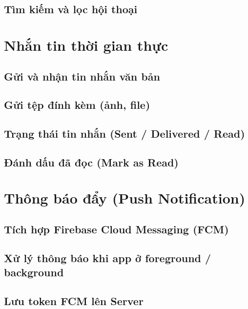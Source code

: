 \subsection{Tìm kiếm và lọc hội thoại}


\section{Nhắn tin thời gian thực}

\subsection{Gửi và nhận tin nhắn văn bản}


\subsection{Gửi tệp đính kèm (ảnh, file)}


\subsection{Trạng thái tin nhắn (Sent / Delivered / Read)}


\subsection{Đánh dấu đã đọc (Mark as Read)}


\section{Thông báo đẩy (Push Notification)}

\subsection{Tích hợp Firebase Cloud Messaging (FCM)}


\subsection{Xử lý thông báo khi app ở foreground / background}


\subsection{Lưu token FCM lên Server}



